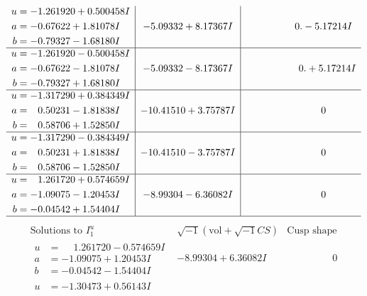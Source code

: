 \documentclass[1p]{elsarticle_modified}
\theoremstyle{definition}
\newcommand{\I}{\sqrt{-1}}
\begin{document}
$$\begin{array}{c|c|c}
\begin{aligned}
u &= -1.261920 + 0.500458 I \\
a &= -0.67622 + 1.81078 I \\
b &= -0.79327 - 1.68180 I\end{aligned}
 & -5.09332 + 8.17367 I & \phantom{-0.000000 } 0. - 5.17214 I \\ \hline\begin{aligned}
u &= -1.261920 - 0.500458 I \\
a &= -0.67622 - 1.81078 I \\
b &= -0.79327 + 1.68180 I\end{aligned}
 & -5.09332 - 8.17367 I & \phantom{-0.000000 -}0. + 5.17214 I \\ \hline\begin{aligned}
u &= -1.317290 + 0.384349 I \\
a &= \phantom{-}0.50231 - 1.81838 I \\
b &= \phantom{-}0.58706 + 1.52850 I\end{aligned}
 & -10.41510 + 3.75787 I & \phantom{-0.000000 } 0 \\ \hline\begin{aligned}
u &= -1.317290 - 0.384349 I \\
a &= \phantom{-}0.50231 + 1.81838 I \\
b &= \phantom{-}0.58706 - 1.52850 I\end{aligned}
 & -10.41510 - 3.75787 I & \phantom{-0.000000 } 0 \\ \hline\begin{aligned}
u &= \phantom{-}1.261720 + 0.574659 I \\
a &= -1.09075 - 1.20453 I \\
b &= -0.04542 + 1.54404 I\end{aligned}
 & -8.99304 - 6.36082 I & \phantom{-0.000000 } 0\\
 \hline 
 \end{array}$$\newpage$$\begin{array}{c|c|c}  
\text{Solutions to }I^u_{1}& \I (\text{vol} + \sqrt{-1}CS) & \text{Cusp shape}\\
 \hline 
\begin{aligned}
u &= \phantom{-}1.261720 - 0.574659 I \\
a &= -1.09075 + 1.20453 I \\
b &= -0.04542 - 1.54404 I\end{aligned}
 & -8.99304 + 6.36082 I & \phantom{-0.000000 } 0 \\ \hline\begin{aligned}
u &= -1.30473 + 0.56143 I \\

\end{aligned}
\end{array}$$
\end{document}

